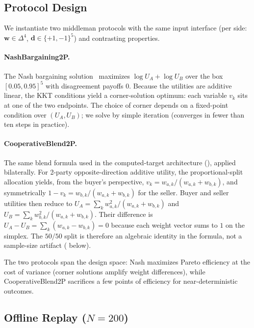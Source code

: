 \documentclass[11pt,a4paper]{article}
\begin{document}
\subsection{Protocol Design}
\label{sec:middleman_design}

We instantiate two middleman protocols with the same input interface (per side: $\mathbf{w} \in \Delta^4$, $\mathbf{d} \in \{+1,-1\}^5$) and contrasting properties.

\paragraph{NashBargaining2P.} The Nash bargaining solution~\citep{nash1950bargaining} maximizes $\log U_A + \log U_B$ over the box $[0.05, 0.95]^5$ with disagreement payoffs $0$. Because the utilities are additive linear, the KKT conditions yield a corner-solution optimum: each variable $v_k$ sits at one of the two endpoints. The choice of corner depends on a fixed-point condition over $(U_A, U_B)$; we solve by simple iteration (converges in fewer than ten steps in practice).

\paragraph{CooperativeBlend2P.} The same blend formula used in the computed-target architecture (), applied bilaterally. For 2-party opposite-direction additive utility, the proportional-split allocation yields, from the buyer's perspective, $v_k = w_{a,k} / (w_{a,k} + w_{b,k})$, and symmetrically $1 - v_k = w_{b,k} / (w_{a,k} + w_{b,k})$ for the seller. Buyer and seller utilities then reduce to $U_A = \sum_k w_{a,k}^2 / (w_{a,k} + w_{b,k})$ and $U_B = \sum_k w_{b,k}^2 / (w_{a,k} + w_{b,k})$. Their difference is $U_A - U_B = \sum_k (w_{a,k} - w_{b,k}) = 0$ because each weight vector sums to $1$ on the simplex. The $50/50$ split is therefore an algebraic identity in the formula, not a sample-size artifact ( below).

The two protocols span the design space: Nash maximizes Pareto efficiency at the cost of variance (corner solutions amplify weight differences), while CooperativeBlend2P sacrifices a few points of efficiency for near-deterministic outcomes.

\subsection{\texorpdfstring{Offline Replay ($N = 200$)}{Offline Replay (N = 200)}}
\label{sec:middleman_offline}
\end{document}
